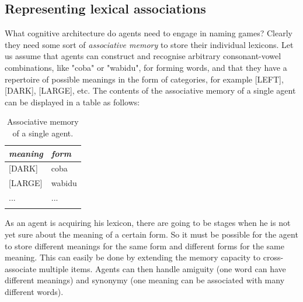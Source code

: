 \subsection{Representing lexical associations}

What cognitive architecture do agents need to engage in naming 
games? Clearly they need some sort of {\itshape associative memory} to
store their individual lexicons.
Let us assume that agents 
can construct and recognise arbitrary consonant-vowel combinations, 
like "coba" or "wabidu", for forming words, and that they 
have a repertoire of possible meanings in the form of 
categories, for example [LEFT], [DARK], [LARGE], etc. 
The contents of the associative memory of a single agent can
be displayed in a table as follows: 
\begin{table}
\begin{center}
\begin{tabular}{ l  l }
\lsptoprule
{\itshape meaning} & {\itshape form} \\ 
\midrule{}
{}[DARK] & coba \\ 
{}[LARGE] & wabidu \\ 
... & ... \\ 
\lspbottomrule
\end{tabular}
\end{center}
\caption{\label{tab:t-mem} Associative memory of a single agent.}
\end{table}
As an agent is acquiring his lexicon, there are going to 
be stages when he is not yet sure about the meaning of 
a certain form. So it must be possible for the agent
to store different 
meanings for the same form and different forms for the
same meaning. This can easily be done by extending the memory capacity
to cross-associate multiple items. Agents can then 
handle amiguity (one word can have different
meanings) and synonymy (one meaning can 
be associated with many different words). 

